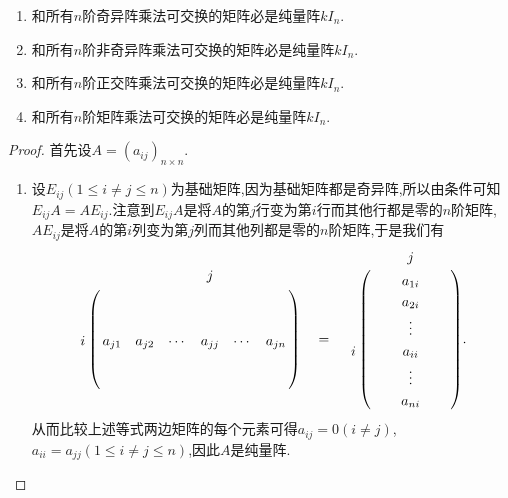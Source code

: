 \documentclass[../../main.tex]{subfiles}%
\begin{document}
\begin{proposition}[纯量矩阵的刻画]\label{proposition:纯量阵的刻画}
\begin{enumerate}
\item 和所有\(n\)阶奇异阵乘法可交换的矩阵必是纯量阵\(kI_{n}\).

\item 和所有\(n\)阶非奇异阵乘法可交换的矩阵必是纯量阵\(kI_{n}\).

\item 和所有\(n\)阶正交阵乘法可交换的矩阵必是纯量阵\(kI_{n}\).

\item 和所有\(n\)阶矩阵乘法可交换的矩阵必是纯量阵\(kI_{n}\).
\end{enumerate}
\end{proposition}
\begin{proof}

首先设$A=(a_{ij})_{n\times n}$.
\begin{enumerate}
\item 设\(E_{ij}(1\leqslant  i\neq j\leqslant  n)\)为基础矩阵,因为基础矩阵都是奇异阵,所以由条件可知\(E_{ij}A = AE_{ij}\).注意到\(E_{ij}A\)是将\(A\)的第\(j\)行变为第\(i\)行而其他行都是零的\(n\)阶矩阵,\(AE_{ij}\)是将\(A\)的第\(i\)列变为第\(j\)列而其他列都是零的\(n\)阶矩阵,于是我们有
\begin{align*}
\bordermatrix{%
&    &		&		&		j&		&
\cr
&    &		&		&		&		&		\cr
&   &		&		&		&		&		\cr
i&    a_{j1}&		a_{j2}&		\cdots&		a_{jj}&		\cdots&		a_{jn}
\cr
&    &		&		&		&		&		\cr
&    &		&		&		&		&		\cr
} \quad= \quad \bordermatrix{%
&    &       &             j&     &
\cr
&    &		&		a_{1i}&		&		\cr
&    &		&		a_{2i}&		&		\cr
&    &		&		\vdots&		&		\cr
i&    &		&		a_{ii}&		&		\cr
&    &		&		\vdots&		&		\cr
&    &		&		a_{ni}&		&		\cr
}.
\end{align*}
从而比较上述等式两边矩阵的每个元素可得\(a_{ij}=0(i\neq j)\),\(a_{ii}=a_{jj}(1\leqslant  i\neq j\leqslant  n)\),因此\(A\)是纯量阵.


\end{enumerate}
\end{proof}
\end{document}
